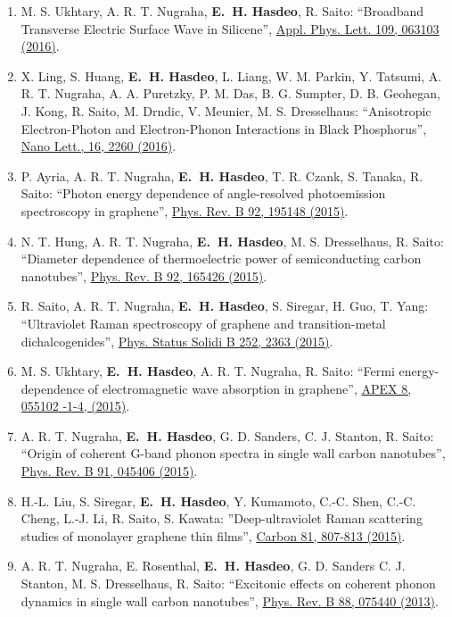 \documentclass[a4paper,11pt]{article}
\def\hes{{\bf E.~H. Hasdeo}}
\begin{document}
\begin{enumerate}
\item M. S. Ukhtary, A. R. T. Nugraha, \hes, R. Saito: ``Broadband
  Transverse Electric Surface Wave in Silicene'',
  \href{http://dx.doi.org/10.1063/1.4960531}{Appl. Phys. Lett. 109,
    063103 (2016)}.
\item X. Ling, S. Huang, \hes, L. Liang, W. M. Parkin, Y. Tatsumi,
  A. R. T. Nugraha, A. A. Puretzky, P. M. Das, B. G. Sumpter,
  D. B. Geohegan, J. Kong, R. Saito, M. Drndic, V. Meunier,
  M. S. Dresselhaus: ``Anisotropic Electron-Photon and Electron-Phonon
  Interactions in Black Phosphorus'',
  \href{http://dx.doi.org/10.1021/acs.nanolett.5b04540} {Nano Lett.,
    16, 2260 (2016)}.
\item P. Ayria, A. R. T. Nugraha, \hes, T. R. Czank, S. Tanaka, R. Saito:
``Photon energy dependence of angle-resolved photoemission spectroscopy in graphene'', \href{http://dx.doi.org/10.1103/PhysRevB.92.195148} {Phys. Rev. B 92, 195148 (2015)}. 
\item N. T. Hung, A. R. T. Nugraha, \hes, M. S. Dresselhaus, R. Saito:
  ``Diameter dependence of thermoelectric power of semiconducting
  carbon nanotubes'', \href{http://dx.doi.org/10.1103/PhysRevB.92.165426}
  {Phys. Rev. B 92, 165426 (2015)}.
\item R. Saito, A. R. T. Nugraha, \hes, S. Siregar, H. Guo, T. Yang:
  ``Ultraviolet Raman spectroscopy of graphene and transition-metal
  dichalcogenides'', \href{http://dx.doi.org/10.1002/pssb.201552201}
  {Phys. Status Solidi B 252, 2363 (2015)}.
\item M. S. Ukhtary, \hes, A. R. T. Nugraha, R. Saito: ``Fermi
  energy-dependence of electromagnetic wave absorption in graphene'',
  \href{http://dx.doi.org/10.7567/APEX.8.055102} {APEX 8, 055102 -1-4,
    (2015)}. 
\item A. R. T. Nugraha, \hes, G. D. Sanders, C. J. Stanton, R. Saito:
  ``Origin of coherent G-band phonon spectra in single wall carbon
  nanotubes'', \href{http://dx.doi.org/10.1103/PhysRevB.91.045406}
  {Phys. Rev. B 91, 045406 (2015)}.  

  \item H.-L. Liu, S. Siregar, \hes, Y. Kumamoto, C.-C. Shen,
    C.-C. Cheng, L.-J. Li, R. Saito, S. Kawata: ''Deep-ultraviolet
    Raman scattering studies of monolayer graphene thin films'',
    \href{http://dx.doi.org/j.carbon.2014.10.028}{Carbon 81, 807-813
      (2015)}.
\item A. R. T. Nugraha, E. Rosenthal, \hes,
  G. D. Sanders C. J. Stanton, M. S. Dresselhaus, R. Saito:
  ``Excitonic effects on coherent phonon dynamics in single wall
  carbon nanotubes'',
  \href{http://dx.doi.org/10.1103/PhysRevB.88.075440}{ Phys.
      Rev. B 88, 075440 (2013)}.
\end{enumerate}
 \vspace*{\baselineskip}
\end{document}

